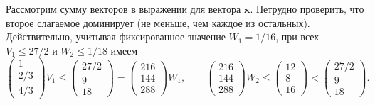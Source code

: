 \documentclass[specialist,
               substylefile = spbu.rtx,
               subf,href,colorlinks=true, 12pt]{disser}
\theoremstyle{definition}
\begin{document}
Рассмотрим сумму векторов в выражении для вектора $\bm{x}$. Нетрудно проверить, что второе слагаемое доминирует (не меньше, чем каждое из остальных). Действительно, учитывая фиксированное значение $W_{1}=1/16$, при всех $V_{1}\leq27/2$ и $W_{2}\leq1/18$ имеем
\begin{equation*}
\begin{pmatrix}
 1
\\
 2/3
\\
 4/3
\end{pmatrix} 
V_{1}
\leq
\begin{pmatrix}
 27/2
\\
 9
\\
 18
\end{pmatrix}
=
\begin{pmatrix}
 216
\\
 144
\\
 288
\end{pmatrix}
 W_{1},
\qquad
\begin{pmatrix}
 216
\\
 144
\\
 288
\end{pmatrix}
 W_{2}
\leq
\begin{pmatrix}
 12
\\
 8
\\
 16
\end{pmatrix}
<
\begin{pmatrix}
 27/2
\\
 9
\\
 18
\end{pmatrix}.
\end{equation*}
\end{document}

